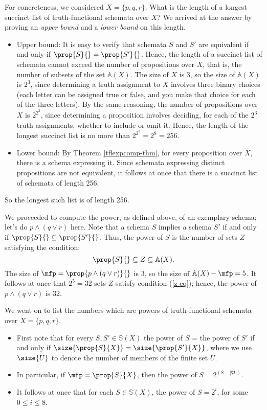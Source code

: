 For concreteness, we considered $X=\{p,q,r\}$. What is the length of a longest succinct list of truth-functional schemata over $X$? We arrived at the answer by proving an \emph{upper bound} and a \emph{lower bound} on this length.
\begin{itemize}
\item Upper bound: It is easy to verify that schemata $S$ and $S'$ are equivalent if and only if $\prop{S}{}=\prop{S'}{}$. Hence, the length of a succinct list of schemata cannot exceed the number of propositions over $X$, that is, the number of subsets of the set $\mathbb{A}(X)$. The size of $X$ is 3, so the size of $\mathbb{A}(X)$ is $2^3$, since determining a truth assignment to $X$ involves three binary choices (each letter can be assigned true or false, and you make that choice for each of the three letters). By the same reasoning, the number of propositions over $X$ is $2^{2^3}$, since determining a proposition involves deciding, for each of the $2^3$ truth assignments, whether to include or omit it. Hence, the length of the longest succinct list is no more than $2^{2^3} = 2^8 = 256$.  
\item Lower bound: By Theorem \ref{tflexpcomp-thm}, for every proposition over $X$, there is a schema expressing it. Since schemata expressing distinct propositions are not equivalent, it follows at once that there is a succinct list of schemata of length 256.
\end{itemize}
So the longest such list is of length 256.

We proceeded to compute the power, as defined above, of an exemplary schema; let's do $p\wedge (q\vee r)$ here. Note that a schema $S$ implies a schema $S'$ if and only if $\prop{S}{}\subseteq\prop{S'}{}$. Thus, the power of $S$ is the number of sets $Z$ satisfying the condition: 
\begin{equation}\label{z-eq}
\prop{S}{}\subseteq Z\subseteq \mathbb{A}(X). 
\end{equation}
The size of $\mfp=\prop{p\wedge (q\vee r)}{}$ is 3, so the size of $\mathbb{A}(X)-\mfp=5$. It follows at once that $2^5 =32$ sets $Z$ satisfy condition (\ref{z-eq}); hence, the power of $p\wedge (q\vee r)$ is 32.

We went on to
list the numbers which are powers of truth-functional schemata over $X=\{p,q,r\}$.
\begin{itemize}
\item First note that for every $S,S'\in\mathbb{S}(X)$ the power of $S$ = the power of $S'$ if and only if $\size{\prop{S}{X}}=\size{\prop{S'}{X}}$, where we use $\size{U}$ to denote the number of members of the finite set $U$. 
\item In particular, if $\mfp=\prop{S}{X}$, then the power of $S = 2^{(8-|\mathfrak{P}|)}$.
\item It follows at once that for each $S\in\mathbb{S}(X)$, the power of $S = 2^i$, for some $0\leq i\leq 8$.
\end{itemize}

